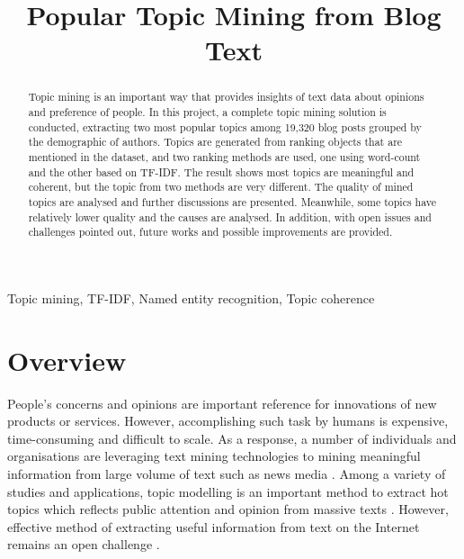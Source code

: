 \documentclass[conference]{IEEEtran}
\begin{document}
\title{Popular Topic Mining from Blog Text\\
}

\author{
}

\maketitle

\begin{abstract}

Topic mining is an important way that provides insights of text data
about opinions and preference of people. In this project, a complete
topic mining solution is conducted, extracting two most popular topics
among 19,320 blog posts grouped by the demographic of authors. Topics
are generated from ranking objects that are mentioned in the dataset,
and two ranking methods are used, one using word-count and the other
based on TF-IDF. The result shows most topics are meaningful and
coherent, but the topic from two methods are very different. The quality
of mined topics are analysed and further discussions are presented.
Meanwhile, some topics have relatively lower quality and the causes are
analysed. In addition, with open issues and challenges pointed out,
future works and possible improvements are provided.

\end{abstract}

\begin{IEEEkeywords}
Topic mining, TF-IDF, Named entity recognition, Topic coherence
\end{IEEEkeywords}

\hypertarget{overview}{%
\section{Overview}\label{overview}}

People's concerns and opinions are important reference for innovations
of new products or services. However, accomplishing such task by humans
is expensive, time-consuming and difficult to scale. As a response, a
number of individuals and organisations are leveraging text mining
technologies to mining meaningful information from large volume of text
such as news media \autocite{jacobi_quantitative_2016}. Among a variety
of studies and applications, topic modelling is an important method to
extract hot topics which reflects public attention and opinion from
massive texts
\autocite{jacobi_quantitative_2016,waila_blog_2013,guo_mining_2012}.
However, effective method of extracting useful information from text on
the Internet remains an open challenge \autocite{guo_mining_2012}.
\end{document}
